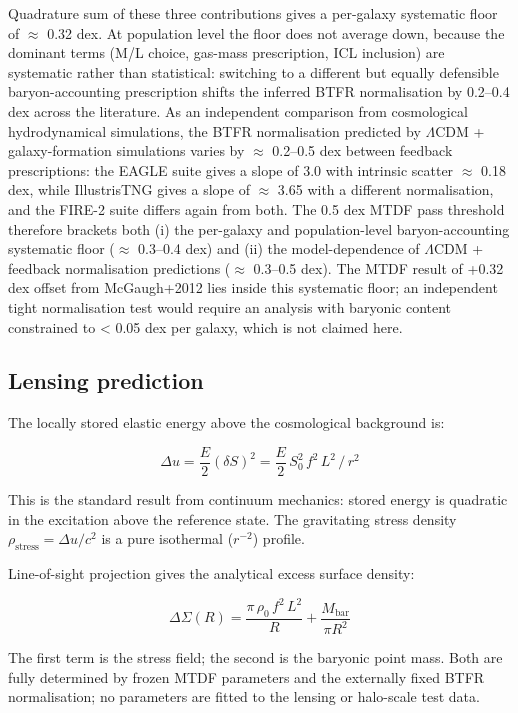 \documentclass[11pt,a4paper]{article}
\begin{document}
Quadrature sum of these three contributions gives a per-galaxy systematic floor of $\approx$ 0.32 dex. At population level the floor does not average down, because the dominant terms (M/\allowbreak{}L choice, gas-mass prescription, ICL inclusion) are systematic rather than statistical: switching to a different but equally defensible baryon-accounting prescription shifts the inferred BTFR normalisation by 0.2--0.4 dex across the literature. As an independent comparison from cosmological hydrodynamical simulations, the BTFR normalisation predicted by $\Lambda$CDM + galaxy-formation simulations varies by $\approx$ 0.2--0.5 dex between feedback prescriptions: the EAGLE suite gives a slope of 3.0 with intrinsic scatter $\approx$ 0.18 dex, while IllustrisTNG gives a slope of $\approx$ 3.65 with a different normalisation, and the FIRE-2 suite differs again from both. The 0.5 dex MTDF pass threshold therefore brackets both (i) the per-galaxy and population-level baryon-accounting systematic floor ($\approx$ 0.3--0.4 dex) and (ii) the model-dependence of $\Lambda$CDM + feedback normalisation predictions ($\approx$ 0.3--0.5 dex). The MTDF result of +0.32 dex offset from McGaugh+2012 lies inside this systematic floor; an independent tight normalisation test would require an analysis with baryonic content constrained to < 0.05 dex per galaxy, which is not claimed here.

\subsection{Lensing prediction}
The locally stored elastic energy above the cosmological background is:

\[ \Delta u = \frac{E}{2}(\delta S)^2 = \frac{E}{2}\,S_0^2\,f^2\,L^2\,/\,r^2 \]

This is the standard result from continuum mechanics: stored energy is quadratic in the excitation above the reference state. The gravitating stress density \(\rho_{\mathrm{stress}} = \Delta u / c^2\) is a pure isothermal (\(r^{-2}\)) profile.

Line-of-sight projection gives the analytical excess surface density:

\[ \Delta\Sigma(R) = \frac{\pi\,\rho_0\,f^2\,L^2}{R} + \frac{M_{\mathrm{bar}}}{\pi R^2} \]

The first term is the stress field; the second is the baryonic point mass. Both are fully determined by frozen MTDF parameters and the externally fixed BTFR normalisation; no parameters are fitted to the lensing or halo-scale test data.
\end{document}
